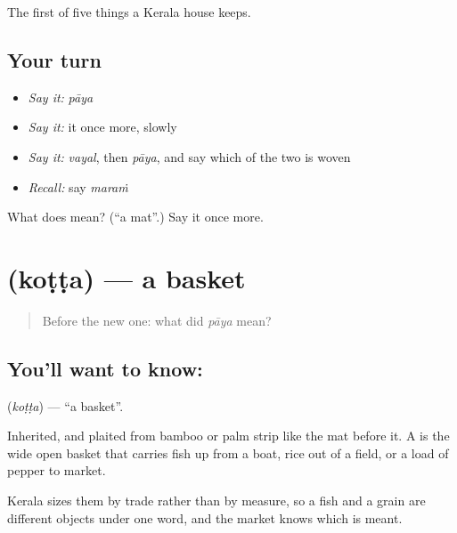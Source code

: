 \begin{grammarlens}[title={What you've built}]
The first of five things a Kerala house keeps.
\end{grammarlens}

\subsection*{Your turn}
\begin{itemize}
\raggedright
  \item \emph{Say it:} \emph{pāya}
  \item \emph{Say it:} it once more, slowly
  \item \emph{Say it:} \emph{vayal}, then \emph{pāya}, and say which of the two is woven
  \item \emph{Recall:} say \emph{maraṁ}
\end{itemize}

\begin{tcolorbox}[breakable,colback=teal!4,colframe=teal!35!black,title={Before you move on}]
What does  mean? (\textquotedblleft{}a mat\textquotedblright{}.) Say it once more.
\end{tcolorbox}
\section[\texorpdfstring{\ml{കൊട്ട} (koṭṭa)}{കൊട്ട (koṭṭa)}]{ (koṭṭa) — a basket}

\label{lesson:ML-C56-basket}



\begin{quote}
Before the new one: what did \emph{pāya} mean?
\end{quote}

\subsection*{You'll want to know: }
\textbf{} (\emph{koṭṭa}) — \textquotedblleft{}a basket\textquotedblright{}.

Inherited, and plaited from bamboo or palm strip like the mat before it. A  is the wide open basket that carries fish up from a boat, rice out of a field, or a load of pepper to market.

Kerala sizes them by trade rather than by measure, so a fish  and a grain  are different objects under one word, and the market knows which is meant.

